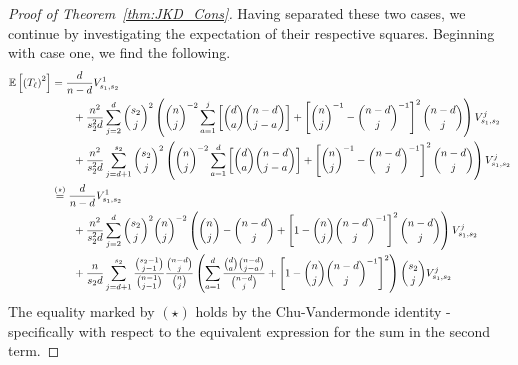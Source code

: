 \begin{proof}[Proof of Theorem~\ref{thm:JKD_Cons}]
	Having separated these two cases, we continue by investigating the expectation
	of their respective squares. Beginning with case one, we find the following.
	\begin{equation}
		\begin{aligned}
			\mathbb{E}\left[\left(T_{\ell}\right)^2\right]
			 & = \frac{d}{n - d} V_{s_1, s_2}^{1}                                                                                                          \\
			 & \quad \quad + \frac{n^2}{s_2^2 d}\sum_{j = 2}^{d}\binom{s_2}{j}^2
			\left(\binom{n}{j}^{-2}\sum_{a = 1}^{j}\left[\binom{d}{a}\binom{n - d}{j - a}\right]
			+ \left[\binom{n}{j}^{-1} - \binom{n-d}{j}^{-1}\right]^{2} \binom{n - d}{j}\right)V_{s_1, s_2}^{j}                                             \\
			 & \quad \quad + \frac{n^2}{s_2^2 d}\sum_{j = d + 1}^{s_2}\binom{s_2}{j}^2
			\left(\binom{n}{j}^{-2}\sum_{a = 1}^{d}\left[\binom{d}{a}\binom{n - d}{j - a}\right]
			+ \left[\binom{n}{j}^{-1} - \binom{n-d}{j}^{-1}\right]^{2}\binom{n - d}{j}\right)V_{s_1, s_2}^{j}                                              \\
			 & \overset{(\star)}{=} \frac{d}{n - d} V_{s_1, s_2}^{1}                                                                                       \\
			 & \quad \quad + \frac{n^2}{s_2^2 d}\sum_{j = 2}^{d}\binom{s_2}{j}^2\binom{n}{j}^{-2}
			\left(\binom{n}{j} - \binom{n - d}{j}
			+ \left[1 - \binom{n}{j}\binom{n-d}{j}^{-1}\right]^{2}\binom{n - d}{j} \right)V_{s_1, s_2}^{j}                                                 \\
			 & \quad \quad + \frac{n}{s_2 d}\sum_{j = d + 1}^{s_2}\frac{\binom{s_2 - 1}{j - 1}}{\binom{n - 1}{j - 1}}\frac{\binom{n - d}{j}}{\binom{n}{j}}
			\left(\sum_{a = 1}^{d}\frac{\binom{d}{a}\binom{n - d}{j - a}}{\binom{n - d}{j}}
			+ \left[1 - \binom{n}{j}\binom{n-d}{j}^{-1}\right]^{2}\right)\binom{s_2}{j}V_{s_1, s_2}^{j}
		\end{aligned}
	\end{equation}
	The equality marked by $(\star)$ holds by the Chu-Vandermonde identity - specifically with respect to the equivalent expression for the sum in the second term.


\end{proof}

